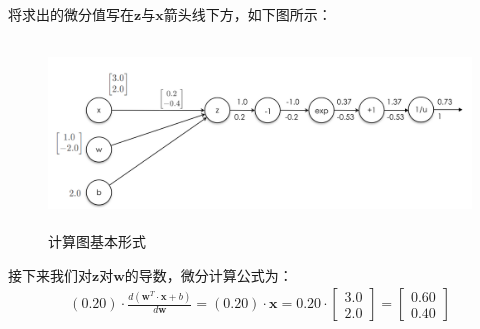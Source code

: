 \documentclass[UTF8]{article}
\begin{document}
将求出的微分值写在$\boldsymbol{z}$与$\boldsymbol{x}$箭头线下方，如下图所示：
\begin{figure}[H]
	\caption{计算图基本形式}
	\label{f000047}
	\centering
	\includegraphics[height=5cm]{images/f000047}
\end{figure}
接下来我们对$\boldsymbol{z}$对$\boldsymbol{w}$的导数，微分计算公式为：
\begin{equation}
\begin{aligned}
(0.20) \cdot \frac{d(\boldsymbol{w}^T \cdot \boldsymbol{x}+b)}{d\boldsymbol{w}}=(0.20) \cdot \boldsymbol{x}=0.20 \cdot \begin{bmatrix}
3.0 \\
2.0
\end{bmatrix}=\begin{bmatrix}
0.60 \\
0.40
\end{bmatrix}
\end{aligned}
\label{mlp-sigmoid-cg-10}
\end{equation}
\end{document}

